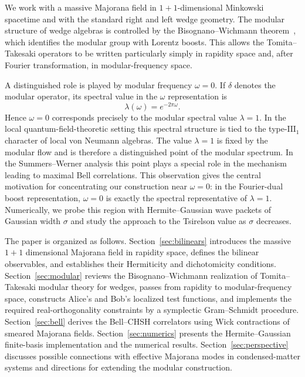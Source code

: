 \documentclass[11pt]{article}
\begin{document}
We work with a massive Majorana field in $1+1$-dimensional Minkowski spacetime and with the standard right and left wedge geometry. The modular structure of wedge algebras is controlled by the Bisognano--Wichmann theorem~\cite{BisognanoWichmann1975,BisognanoWichmann1976}, which identifies the modular group with Lorentz boosts. This allows the Tomita--Takesaki operators to be written particularly simply in rapidity space and, after Fourier transformation, in modular-frequency space.

A distinguished role is played by modular frequency $\omega=0$. If $\delta$ denotes the modular operator, its spectral value in the $\omega$ representation is
\begin{equation}
 \lambda(\omega)=e^{-2\pi\omega}.
 \label{eq:lambdaomega_intro}
\end{equation}
Hence $\omega=0$ corresponds precisely to the modular spectral value $\lambda=1$. In the local quantum-field-theoretic setting this spectral structure is tied to the type-$\mathrm{III}_1$ character of local von Neumann algebras. The value $\lambda=1$ is fixed by the modular flow and is therefore a distinguished point of the modular spectrum. In the Summers--Werner analysis this point plays a special role in the mechanism leading to maximal Bell correlations. This observation gives the central motivation for concentrating our construction near $\omega=0$: in the Fourier-dual boost representation, $\omega=0$ is exactly the spectral representative of $\lambda=1$. Numerically, we probe this region with Hermite--Gaussian wave packets of Gaussian width $\sigma$ and study the approach to the Tsirelson value as $\sigma$ decreases.

The paper is organized as follows. Section~\ref{sec:bilinears} introduces the massive $1+1$ dimensional Majorana field in rapidity space, defines the bilinear observables, and establishes their Hermiticity and dichotomicity conditions. Section~\ref{sec:modular} reviews the Bisognano--Wichmann realization of Tomita--Takesaki modular theory for wedges, passes from rapidity to modular-frequency space, constructs Alice's and Bob's localized test functions, and implements the required real-orthogonality constraints by a symplectic Gram--Schmidt procedure. Section~\ref{sec:bell} derives the Bell--CHSH correlators using Wick contractions of smeared Majorana fields. Section~\ref{sec:numerics} presents the Hermite--Gaussian finite-basis implementation and the numerical results. Section~\ref{sec:perspective} discusses possible connections with effective Majorana modes in condensed-matter systems and directions for extending the modular construction.
\end{document}
